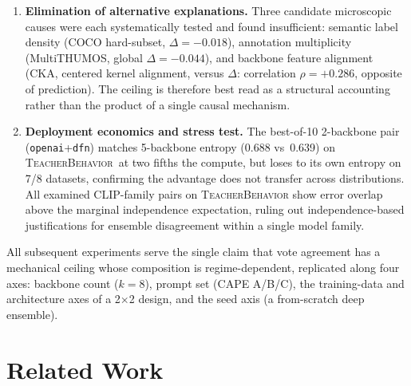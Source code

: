 \documentclass[a4paper,fleqn]{cas-sc}
\newcommand{\tb}{\textsc{TeacherBehavior}}
\begin{document}
\begin{enumerate}
    \item \textbf{Elimination of alternative explanations.}
    Three candidate microscopic causes were each systematically tested and found insufficient: semantic label density (COCO hard-subset, $\Delta = -0.018$), annotation multiplicity (MultiTHUMOS, global $\Delta = -0.044$), and backbone feature alignment (CKA, centered kernel alignment, versus $\Delta$: correlation $\rho = +0.286$, opposite of prediction).
    The ceiling is therefore best read as a structural accounting rather than the product of a single causal mechanism.

    \item \textbf{Deployment economics and stress test.}
    The best-of-10 2-backbone pair (\texttt{openai}+\texttt{dfn}) matches 5-backbone entropy (0.688 vs~0.639) on \tb\ at two fifths the compute, but loses to its own entropy on 7/8 datasets, confirming the advantage does not transfer across distributions.
    All examined CLIP-family pairs on \tb{} show error overlap above the marginal independence expectation, ruling out independence-based justifications for ensemble disagreement within a single model family.
\end{enumerate}

All subsequent experiments serve the single claim that vote agreement has a mechanical ceiling whose composition is regime-dependent, replicated along four axes: backbone count ($k{=}8$), prompt set (CAPE A/B/C), the training-data and architecture axes of a 2$\times$2 design, and the seed axis (a from-scratch deep ensemble).

\section{Related Work}
\label{sec:related}
\end{document}
